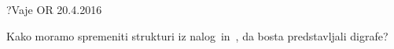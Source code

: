 \begin{naloga}{?}{Vaje OR 20.4.2016}
\begin{vprasanje}
Kako moramo spremeniti strukturi
iz nalog~\nal[matgraf] in~\nal[sosgraf],
da bosta predstavljali digrafe?
\end{vprasanje}
\begin{odgovor}
\end{odgovor}
\end{naloga}

